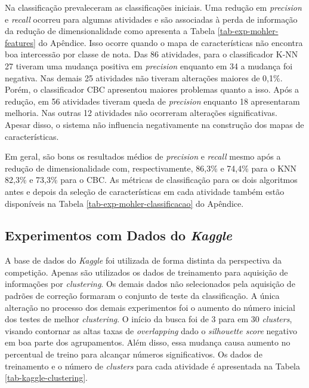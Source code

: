 Na classificação prevaleceram as classificações iniciais. Uma redução em \textit{precision} e \textit{recall} ocorreu para algumas atividades e são associadas à perda de informação da redução de dimensionalidade como apresenta a Tabela \ref{tab-exp-mohler-features} do Apêndice. Isso ocorre quando o mapa de características não encontra boa intercessão por classe de nota. Das 86 atividades, para o classificador K-NN 27 tiveram uma mudança positiva em \textit{precision} enquanto em 34 a mudança foi negativa. Nas demais 25 atividades não tiveram alterações maiores de 0,1\%. Porém, o classificador CBC apresentou maiores problemas quanto a isso. Após a redução, em 56 atividades tiveram queda de \textit{precision} enquanto 18 apresentaram melhoria. Nas outras 12 atividades não ocorreram alterações significativas. Apesar disso, o sistema não influencia negativamente na construção dos mapas de características. 

Em geral, são bons os resultados médios de \textit{precision} e \textit{recall} mesmo após a redução de dimensionalidade com, respectivamente, 86,3\% e 74,4\% para o KNN 82,3\% e 73,3\% para o CBC. As métricas de classificação para os dois algoritmos antes e depois da seleção de características em cada atividade também estão disponíveis na Tabela \ref{tab-exp-mohler-classificacao} do Apêndice.

\subsection{Experimentos com Dados do \it{Kaggle}}
A base de dados do \textit{Kaggle} foi utilizada de forma distinta da perspectiva da competição. Apenas são utilizados os dados de treinamento para aquisição de informações por \textit{clustering}. Os demais dados não selecionados pela aquisição de padrões de correção formaram o conjunto de teste da classificação. A única alteração no processo dos demais experimentos foi o aumento do número inicial dos testes de melhor \textit{clustering}. O início da busca foi de 3 para em 30 \textit{clusters}, visando contornar as altas taxas de \textit{overlapping} dado o \textit{silhouette score} negativo em boa parte dos agrupamentos. Além disso, essa mudança causa aumento no percentual de treino para alcançar números significativos. Os dados de treinamento e o número de \textit{clusters} para cada atividade é apresentada na Tabela \ref{tab-kaggle-clustering}.

